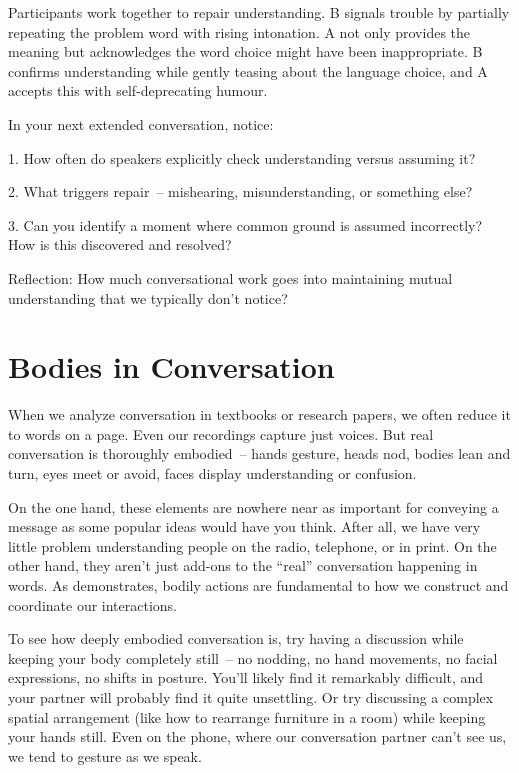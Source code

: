 Participants work together to repair understanding. B signals trouble by partially repeating the problem word with rising intonation. A not only provides the meaning but acknowledges the word choice might have been inappropriate. B confirms understanding while gently teasing about the language choice, and A accepts this with self-deprecating humour.

\begin{tcolorbox}[title=Exercise: Tracking Common Ground, colback=white, colframe=purple!75!black, fonttitle=\bfseries]
In your next extended conversation, notice:

1. How often do speakers explicitly check understanding versus assuming it?

2. What triggers repair~-- mishearing, misunderstanding, or something else?

3. Can you identify a moment where common ground is assumed incorrectly? How is this discovered and resolved?

Reflection: How much conversational work goes into maintaining mutual understanding that we typically don't notice?
\end{tcolorbox}

\section{Bodies in Conversation} \label{sec:bodies}

When we analyze conversation in textbooks or research papers, we often reduce it to words on a page. Even our recordings capture just voices. But real conversation is thoroughly embodied~-- hands gesture, heads nod, bodies lean and turn, eyes meet or avoid, faces display understanding or confusion.

On the one hand, these elements are nowhere near as important for conveying a message as some popular ideas would have you think. After all, we have very little problem understanding people on the radio, telephone, or in print. On the other hand, they aren't just add-ons to the ``real'' conversation happening in words. As \citet{goodwin2000} demonstrates, bodily actions are fundamental to how we construct and coordinate our interactions.

To see how deeply embodied conversation is, try having a discussion while keeping your body completely still~-- no nodding, no hand movements, no facial expressions, no shifts in posture. You'll likely find it remarkably difficult, and your partner will probably find it quite unsettling. Or try discussing a complex spatial arrangement (like how to rearrange furniture in a room) while keeping your hands still. Even on the phone, where our conversation partner can't see us, we tend to gesture as we speak.

